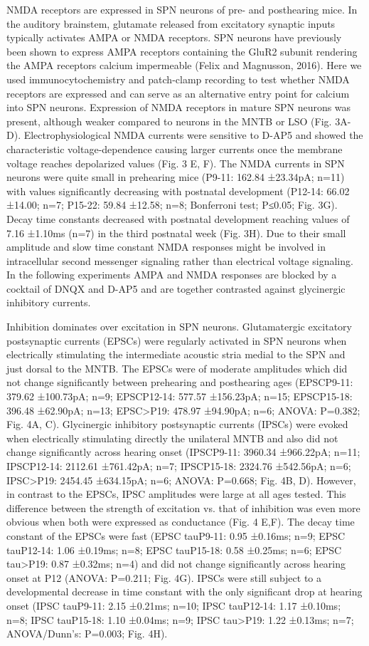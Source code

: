 \documentclass{article}
\begin{document}
NMDA receptors are expressed in SPN neurons of pre- and posthearing mice.
In the auditory brainstem, glutamate released from excitatory synaptic inputs typically activates AMPA or NMDA receptors. SPN neurons have previously been shown to express AMPA receptors containing the GluR2 subunit rendering the AMPA receptors calcium impermeable (Felix and Magnusson, 2016). Here we used immunocytochemistry and patch-clamp recording to test whether NMDA receptors are expressed and can serve as an alternative entry point for calcium into SPN neurons. Expression of NMDA receptors in mature SPN neurons was present, although weaker compared to neurons in the MNTB or LSO (Fig. 3A-D).  Electrophysiological NMDA currents were sensitive to D-AP5 and showed the characteristic voltage-dependence causing larger currents once the membrane voltage reaches depolarized values (Fig. 3 E, F). The NMDA currents in SPN neurons were quite small in prehearing mice (P9-11: 162.84 ±23.34pA; n=11) with values significantly decreasing with postnatal development (P12-14: 66.02 ±14.00; n=7; P15-22: 59.84 ±12.58; n=8; Bonferroni test; P≤0.05; Fig. 3G). Decay time constants decreased with postnatal development reaching values of 7.16 ±1.10ms (n=7) in the third postnatal week (Fig. 3H).  Due to their small amplitude and slow time constant NMDA responses might be involved in intracellular second messenger signaling rather than electrical voltage signaling. In the following experiments AMPA and NMDA responses are blocked by a cocktail of DNQX and D-AP5 and are together contrasted against glycinergic inhibitory currents. 

Inhibition dominates over excitation in SPN neurons.
Glutamatergic excitatory postsynaptic currents (EPSCs) were regularly activated in SPN neurons when electrically stimulating the intermediate acoustic stria medial to the SPN and just dorsal to the MNTB. The EPSCs were of moderate amplitudes which did not change significantly between prehearing and posthearing ages (EPSCP9-11: 379.62 ±100.73pA; n=9; EPSCP12-14: 577.57 ±156.23pA; n=15; EPSCP15-18: 396.48 ±62.90pA; n=13; EPSC>P19: 478.97 ±94.90pA; n=6; ANOVA: P=0.382; Fig. 4A, C). Glycinergic inhibitory postsynaptic currents (IPSCs) were evoked when electrically stimulating directly the unilateral MNTB and also did not change significantly across hearing onset (IPSCP9-11: 3960.34 ±966.22pA; n=11; IPSCP12-14: 2112.61 ±761.42pA; n=7; IPSCP15-18: 2324.76 ±542.56pA; n=6; IPSC>P19: 2454.45 ±634.15pA; n=6; ANOVA: P=0.668; Fig. 4B, D). However, in contrast to the EPSCs, IPSC amplitudes were large at all ages tested. This difference between the strength of excitation vs. that of inhibition was even more obvious when both were expressed as conductance (Fig. 4 E,F). The decay time constant of the EPSCs were fast (EPSC tauP9-11: 0.95 ±0.16ms; n=9; EPSC tauP12-14: 1.06 ±0.19ms; n=8; EPSC tauP15-18: 0.58 ±0.25ms; n=6; EPSC tau>P19: 0.87 ±0.32ms; n=4) and did not change significantly across hearing onset at P12 (ANOVA: P=0.211; Fig. 4G). IPSCs were still subject to a developmental decrease in time constant with the only significant drop at hearing onset (IPSC tauP9-11: 2.15 ±0.21ms; n=10; IPSC tauP12-14: 1.17 ±0.10ms; n=8; IPSC tauP15-18: 1.10 ±0.04ms; n=9; IPSC tau>P19: 1.22 ±0.13ms; n=7; ANOVA/Dunn’s: P=0.003; Fig. 4H).
\end{document}
